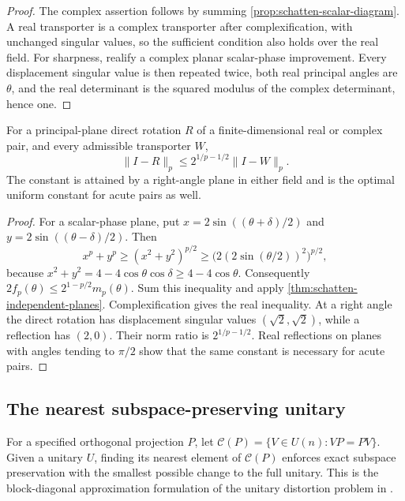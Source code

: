 \begin{proof}
The complex assertion follows by summing
\cref{prop:schatten-scalar-diagram}. A real transporter is a complex
transporter after complexification, with unchanged singular values, so
the sufficient condition also holds over the real field. For sharpness,
realify a complex planar scalar-phase improvement. Every displacement
singular value is then repeated twice, both real principal angles are
$\theta$, and the real determinant is the squared modulus of the complex
determinant, hence one.
\end{proof}

\begin{corollary}
\label{cor:schatten-sharp-ratio}
For a principal-plane direct rotation $R$ of a finite-dimensional real
or complex pair, and every admissible transporter $W$,
\begin{equation}
 \|I-R\|_p\leq 2^{1/p-1/2}\|I-W\|_p.
 \label{eq:schatten-sharp-ratio}
\end{equation}
The constant is attained by a right-angle plane in either field and is
the optimal uniform constant for acute pairs as well.
\end{corollary}

\begin{proof}
For a scalar-phase plane, put
$x=2\sin((\theta+\delta)/2)$ and
$y=2\sin((\theta-\delta)/2)$. Then
\[
 x^p+y^p\geq(x^2+y^2)^{p/2}
 \geq\bigl(2(2\sin(\theta/2))^2\bigr)^{p/2},
\]
because $x^2+y^2=4-4\cos\theta\cos\delta
\geq4-4\cos\theta$. Consequently
$2f_p(\theta)\leq2^{1-p/2}m_p(\theta)$.
Sum this inequality and apply \cref{thm:schatten-independent-planes}.
Complexification gives the real inequality. At a right angle the direct
rotation has displacement singular values $(\sqrt2,\sqrt2)$, while a
reflection has $(2,0)$. Their norm ratio is $2^{1/p-1/2}$. Real
reflections on planes with angles tending to $\pi/2$ show that the same
constant is necessary for acute pairs.
\end{proof}

\subsection{The nearest subspace-preserving unitary}

For a specified orthogonal projection $P$, let
$\mathcal C(P)=\{V\in U(n):VP=PV\}$. Given a unitary $U$, finding its
nearest element of $\mathcal C(P)$ enforces exact subspace preservation
with the smallest possible change to the full unitary.
This is the block-diagonal approximation formulation of the unitary
distortion problem in \citet[Section~3]{bolotnikov2001minimal}.

